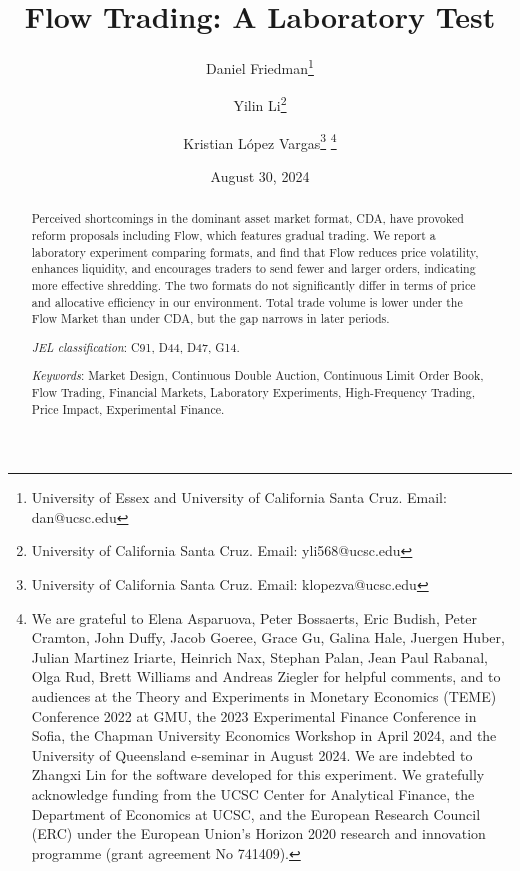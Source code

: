 \documentclass[12pt]{article}
\title{Flow Trading: A Laboratory Test}
\author{
  Daniel Friedman\thanks{
  University of Essex and University of California Santa Cruz. Email: dan@ucsc.edu} 
\and
  Yilin Li\thanks{
  University of California Santa Cruz. Email: yli568@ucsc.edu} 
\and
  Kristian L\'opez Vargas\thanks{
  University of California Santa Cruz. Email: klopezva@ucsc.edu}
  \thanks{
We are grateful to Elena Asparuova, Peter Bossaerts, Eric Budish, Peter Cramton, John Duffy,  Jacob Goeree, Grace Gu, Galina Hale, Juergen Huber, Julian Martinez Iriarte, Heinrich Nax, Stephan Palan,  Jean Paul Rabanal, Olga Rud, Brett Williams and  Andreas Ziegler
for helpful comments,  
and to audiences at the Theory and Experiments in Monetary Economics (TEME) Conference 2022 at GMU, the 2023 Experimental Finance Conference in Sofia, the Chapman University Economics Workshop in April 2024, and the University of Queensland e-seminar in August 2024.
We are indebted to Zhangxi Lin for the software developed for this experiment. We
gratefully acknowledge funding from the UCSC Center for Analytical Finance, the Department of Economics at UCSC, and the European Research Council (ERC) under the European Union’s Horizon 2020 research and innovation programme (grant agreement No 741409).}
}
\date{August 30, 2024}
\begin{document}
\maketitle

\vspace{-.4in}
\begin{abstract}
\begin{singlespace}
Perceived shortcomings in the dominant asset market format, CDA, have provoked reform proposals including Flow, which features gradual trading. 
We report a laboratory experiment comparing formats, and
find that Flow reduces price volatility, enhances liquidity, and encourages traders to send fewer and larger orders, indicating more effective shredding. The two formats do not significantly differ in terms of price and allocative efficiency in our environment. 
Total trade volume is lower under the Flow Market than under CDA, but the gap narrows in later periods. 
\bigskip

\noindent\textit{JEL classification}: C91, D44, D47, G14.

\noindent \textit{Keywords}: Market Design, Continuous Double Auction, Continuous Limit Order Book, Flow Trading, Financial Markets, Laboratory Experiments, High-Frequency Trading, Price Impact, Experimental Finance.

\end{singlespace}
\end{abstract}




\newpage
\end{document}
